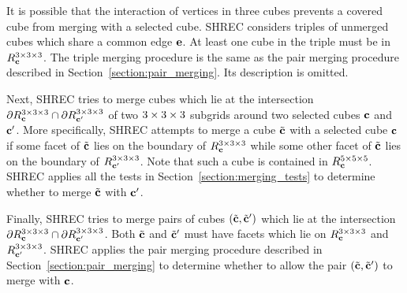 It is possible that the interaction of vertices in three cubes
prevents a covered cube from merging with a selected cube.
SHREC considers triples of unmerged cubes
which share a common edge $\mathbf{e}$.
At least one cube in the triple must be in $R^{3 \times 3 \times 3}_{\mathbf{c}}$.
The triple merging procedure is the same as the pair merging procedure
described in Section~\ref{section:pair_merging}.
Its description is omitted.

Next, SHREC tries to merge cubes which lie 
at the intersection $\partial R^{3 \times 3 \times 3}_{\mathbf{c}} \cap \partial R^{3 \times 3 \times 3}_{\mathbf{c}'}$
of two $3 \times 3 \times 3$ subgrids around two selected cubes $\mathbf{c}$ and $\mathbf{c}'$.
More specifically, SHREC attempts to merge a cube ${\tilde{\mathbf{c}}}$ 
with a selected cube $\mathbf{c}$ if some facet of ${\tilde{\mathbf{c}}}$ lies 
on the boundary of $R^{3 \times 3 \times 3}_{\mathbf{c}}$ 
while some other facet of ${\tilde{\mathbf{c}}}$ lies on the boundary of $R^{3 \times 3 \times 3}_{\mathbf{c}'}$.
Note that such a cube is contained in $R^{5 \times 5 \times 5}_{\mathbf{c}}$.
SHREC applies all the tests in Section~\ref{section:merging_tests}
to determine whether to merge ${\tilde{\mathbf{c}}}$ with $\mathbf{c}'$.

Finally, SHREC tries to merge pairs of cubes $({\tilde{\mathbf{c}}}, {\tilde{\mathbf{c}}}')$ which lie
at the intersection $\partial R^{3 \times 3 \times 3}_{\mathbf{c}} \cap \partial R^{3 \times 3 \times 3}_{\mathbf{c}'}$.
Both ${\tilde{\mathbf{c}}}$ and ${\tilde{\mathbf{c}}}'$ must have facets which lie on $R^{3 \times 3 \times 3}_{\mathbf{c}}$
and $R^{3 \times 3 \times 3}_{\mathbf{c}'}$.
SHREC applies the pair merging procedure described 
in Section~\ref{section:pair_merging} to determine whether
to allow the pair $({\tilde{\mathbf{c}}},{\tilde{\mathbf{c}}}')$ to merge with $\mathbf{c}$.


